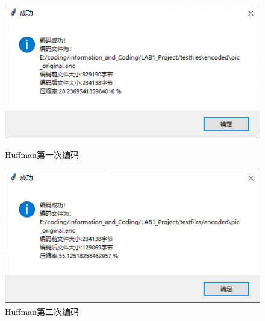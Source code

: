 \documentclass[12pt, a4paper]{ctexart}
\begin{document}
    \begin{figure}[H]
    \centering
    \begin{minipage}[t]{0.45\textwidth}
    \centering
    \includegraphics[width=\textwidth]{./pic/11-1.png}
    \caption{Huffman第一次编码}
    \end{minipage}
    \hfill
    \begin{minipage}[t]{0.45\textwidth}
    \centering
    \includegraphics[width=\textwidth]{./pic/11-2.png}
    \caption{Huffman第二次编码}
    \end{minipage}
    \end{figure}
\end{document}
